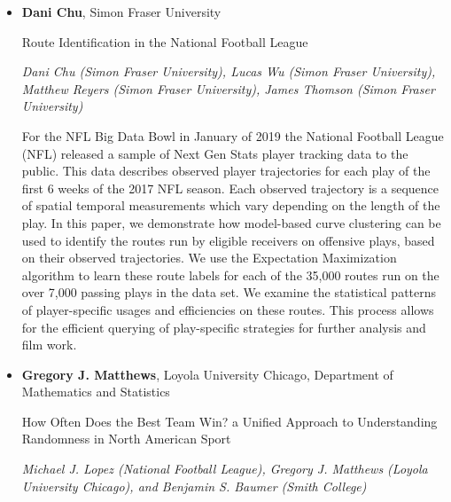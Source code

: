 \begin{itemize}
\item \textbf{Dani Chu}, Simon Fraser University

Route Identification in the National Football League

\emph{\footnotesize Dani Chu (Simon Fraser University), Lucas Wu (Simon Fraser University), Matthew Reyers (Simon Fraser University), James Thomson (Simon Fraser University)}

For the NFL Big Data Bowl in January of 2019 the National Football League (NFL) released a sample of Next Gen Stats player tracking data to the public. This data describes observed player trajectories for each play of the first 6 weeks of the 2017 NFL season. Each observed trajectory is a sequence of spatial temporal measurements which vary depending on the length of the play. In this paper, we demonstrate how model-based curve clustering can be used to identify the routes run by eligible receivers on offensive plays, based on their observed trajectories. We use the Expectation Maximization algorithm to learn these route labels for each of the 35,000 routes run on the over 7,000 passing plays in the data set. We examine the statistical patterns of player-specific usages and efficiencies on these routes. This process allows for the efficient querying of play-specific strategies for further analysis and film work.

\item \textbf{Gregory J. Matthews}, Loyola University Chicago, Department of Mathematics and Statistics

How Often Does the Best Team Win? a Unified Approach to Understanding Randomness in North American Sport

\emph{\footnotesize Michael J. Lopez (National Football League), Gregory J. Matthews (Loyola University Chicago), and Benjamin S. Baumer (Smith College)}


\end{itemize}
